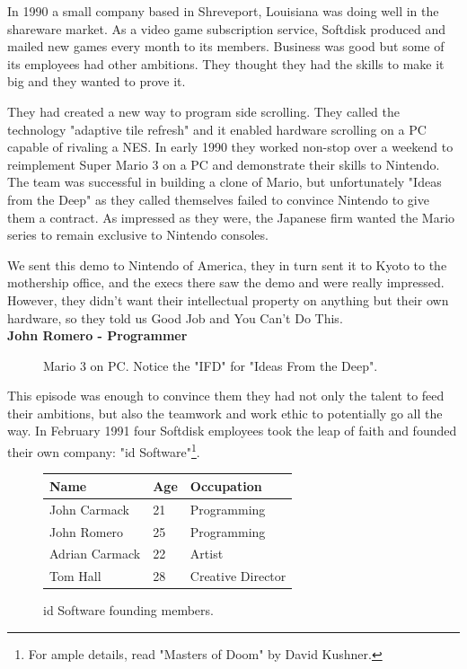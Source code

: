 \documentclass[book.tex]{subfiles}
\begin{document}
\label{chapter_team}
In 1990 a small company based in Shreveport, Louisiana was doing well in the shareware market. As a video game subscription service, Softdisk produced and mailed new games every month to its members. Business was good but some of its employees had other ambitions. They thought they had the skills to make it big and they wanted to prove it.\\
\par
They had created a new way to program side scrolling. They called the technology "adaptive tile refresh" and it enabled hardware scrolling on a PC capable of rivaling a NES. In early 1990 they worked non-stop over a weekend to reimplement Super Mario 3 on a PC and demonstrate their skills to Nintendo. The team was successful in building a clone of Mario, but unfortunately "Ideas from the Deep" as they called themselves failed to convince Nintendo to give them a contract. As impressed as they were, the Japanese firm wanted the Mario series to remain exclusive to Nintendo consoles.\\
\par
\begin{fancyquotes}
We sent this demo to Nintendo of America, they in turn sent it to Kyoto to the mothership office, and the execs there saw the demo and were really impressed. However, they didn't want their intellectual property on anything but their own hardware, so they told us Good Job and You Can't Do This\protect\footnotemark.
 \bigskip \\
\textbf{John Romero - Programmer}
 \end{fancyquotes}
 \begin{figure}[H]
\caption{Mario 3 on PC. Notice the "IFD" for "Ideas From the Deep".}
\end{figure}

\par
This episode was enough to convince them they had not only the talent to feed their ambitions, but also the teamwork and work ethic to potentially go all the way. In February 1991 four Softdisk employees took the leap of faith and founded their own company: "id Software"\footnote{For ample details, read "Masters of Doom" by David Kushner.}. 

 
 \begin{figure}[H]
\centering  
\begin{tabularx}{\textwidth}{ X  X  X  }
  \toprule
  \textbf{Name} &  \textbf{Age} & \textbf{Occupation} \\
  \toprule 
   John Carmack & 21 &  Programming\\
   John Romero & 25 &  Programming\\
   Adrian Carmack & 22 &  Artist\\
   Tom Hall & 28 &  Creative Director\\
     \toprule
\end{tabularx}
\caption{id Software founding members.}\label{fig:Id Software team}
\end{figure}
\end{document}
